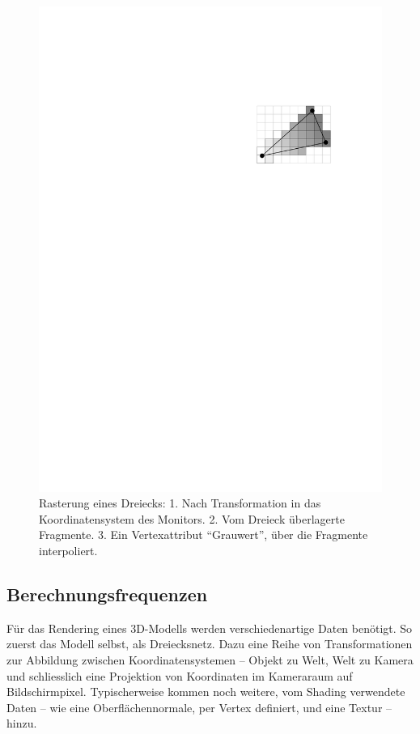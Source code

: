 \documentclass[twoside,a4paper,fleqn,12pt]{article}
\begin{document}
\begin{figure}[h]
  \includegraphics[scale=0.8]{triraster3}
  \caption{Rasterung eines Dreiecks: 1. Nach Transformation in das Koordinatensystem des Monitors.
  2. Vom Dreieck überlagerte Fragmente. 3. Ein Vertexattribut "`Grauwert"', über die Fragmente interpoliert.}
  \label{fig:triraster}
\end{figure}



\subsection{Berechnungsfrequenzen}
\label{berechnungsfrequenz_locker}

Für das Rendering eines 3D-Modells werden verschiedenartige Daten benötigt. So zuerst das Modell selbst, als Dreiecksnetz. Dazu
eine Reihe von Transformationen zur Abbildung zwischen Koordinatensystemen -- Objekt zu Welt, Welt zu Kamera und schliesslich
eine Projektion von Koordinaten im Kameraraum auf Bildschirmpixel. Typischerweise kommen noch weitere, vom Shading verwendete Daten --
wie eine Oberflächennormale, per Vertex definiert, und eine Textur -- hinzu.
\end{document}
